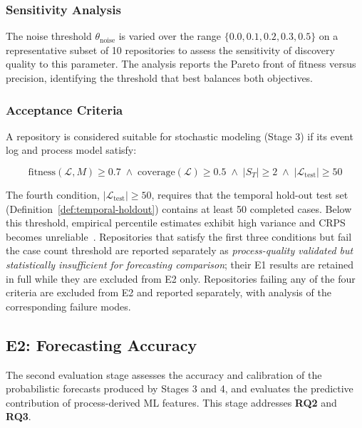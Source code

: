 \subsubsection{Sensitivity Analysis}

The noise threshold $\theta_{\text{noise}}$ is varied over the range 
$\{0.0, 0.1, 0.2, 0.3, 0.5\}$ on a representative subset of 10 
repositories to assess the sensitivity of discovery quality to this 
parameter. The analysis reports the Pareto front of fitness versus 
precision, identifying the threshold that best balances both objectives.

\subsubsection{Acceptance Criteria}

A repository is considered suitable for stochastic modeling (Stage 3) 
if its event log and process model satisfy:

\begin{equation}
\label{eq:acceptance}
\text{fitness}(\mathcal{L}, M) \geq 0.7 \;\wedge\;
\text{coverage}(\mathcal{L}) \geq 0.5 \;\wedge\;
|S_T| \geq 2 \;\wedge\;
|\mathcal{L}_{\text{test}}| \geq 50
\end{equation}

The fourth condition, $|\mathcal{L}_{\text{test}}| \geq 50$, requires
that the temporal hold-out test set
(Definition~\ref{def:temporal-holdout}) contains at least 50 completed
cases. Below this threshold, empirical percentile estimates exhibit
high variance and CRPS becomes unreliable~\cite{gneiting2007strictly}.
Repositories that satisfy the first three conditions but fail the case
count threshold are reported separately as \emph{process-quality
validated but statistically insufficient for forecasting comparison};
their E1 results are retained in full while they are excluded from E2
only. Repositories failing any of the four criteria are excluded from
E2 and reported separately, with analysis of the corresponding failure
modes.


\subsection{E2: Forecasting Accuracy}
\label{sec:e2-design}

The second evaluation stage assesses the accuracy and calibration of 
the probabilistic forecasts produced by Stages 3 and 4, and evaluates 
the predictive contribution of process-derived ML features. This stage 
addresses \textbf{RQ2} and \textbf{RQ3}.

